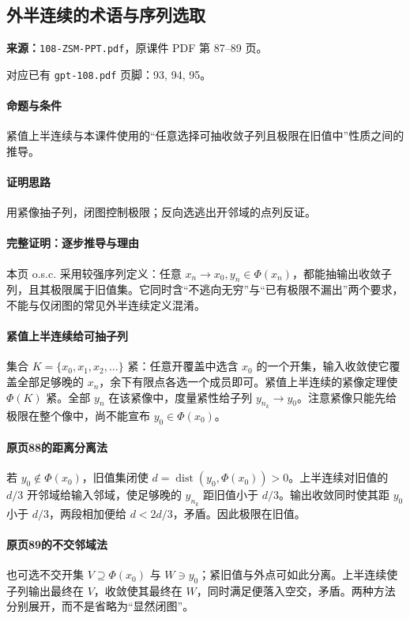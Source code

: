 \clearpage\subsection{外半连续的术语与序列选取}
\textbf{来源：}\texttt{108-ZSM-PPT.pdf}，原课件 PDF 第 87--89 页。\par
对应已有 \texttt{gpt-108.pdf} 页脚：93, 94, 95。\par
\paragraph{命题与条件}紧值上半连续与本课件使用的“任意选择可抽收敛子列且极限在旧值中”性质之间的推导。
\paragraph{证明思路}用紧像抽子列，闭图控制极限；反向选逃出开邻域的点列反证。
\paragraph{完整证明：逐步推导与理由}

本页 o.s.c. 采用较强序列定义：任意 $x_n\to x_0,y_n\in\Phi(x_n)$，都能抽输出收敛子列，且其极限属于旧值集。它同时含“不逃向无穷”与“已有极限不漏出”两个要求，不能与仅闭图的常见外半连续定义混淆。
\paragraph{紧值上半连续给可抽子列}
集合 $K=\{x_0,x_1,x_2,\ldots\}$ 紧：任意开覆盖中选含 $x_0$ 的一个开集，输入收敛使它覆盖全部足够晚的 $x_n$，余下有限点各选一个成员即可。紧值上半连续的紧像定理使 $\Phi(K)$ 紧。全部 $y_n$ 在该紧像中，度量紧性给子列 $y_{n_k}\to y_0$。注意紧像只能先给极限在整个像中，尚不能宣布 $y_0\in\Phi(x_0)$。
\paragraph{原页88的距离分离法}
若 $y_0\notin\Phi(x_0)$，旧值集闭使 $d=\operatorname{dist}(y_0,\Phi(x_0))>0$。上半连续对旧值的 $d/3$ 开邻域给输入邻域，使足够晚的 $y_{n_k}$ 距旧值小于 $d/3$。输出收敛同时使其距 $y_0$ 小于 $d/3$，两段相加便给 $d<2d/3$，矛盾。因此极限在旧值。
\paragraph{原页89的不交邻域法}
也可选不交开集 $V\supseteq\Phi(x_0)$ 与 $W\ni y_0$；紧旧值与外点可如此分离。上半连续使子列输出最终在 $V$，收敛使其最终在 $W$，同时满足便落入空交，矛盾。两种方法分别展开，而不是省略为“显然闭图”。

